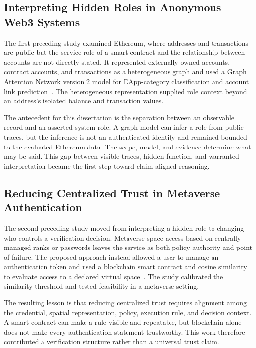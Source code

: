 \subsection{Interpreting Hidden Roles in Anonymous Web3 Systems}
\label{subsec:ch1-trajectory-web3}

The first preceding study examined Ethereum, where addresses and transactions are
public but the service role of a smart contract and the relationship between
accounts are not directly stated.  It represented externally owned accounts,
contract accounts, and transactions as a heterogeneous graph and used a Graph
Attention Network version 2 model for DApp-category classification and account
link prediction~\cite{ko2024ethereum}.  The heterogeneous representation supplied
role context beyond an address's isolated balance and transaction values.

The antecedent for this dissertation is the separation between an observable
record and an asserted system role.  A graph model can infer a role from public
traces, but the inference is not an authenticated identity and remained bounded to
the evaluated Ethereum data.  The scope, model, and evidence determine what may
be said.  This gap between visible traces, hidden function, and warranted
interpretation became the first step toward claim-aligned reasoning.

\subsection{Reducing Centralized Trust in Metaverse Authentication}
\label{subsec:ch1-trajectory-metaverse}

The second preceding study moved from interpreting a hidden role to changing who
controls a verification decision.  Metaverse space access based on centrally
managed ranks or passwords leaves the service as both policy authority and point
of failure.  The proposed approach instead allowed a user to manage an
authentication token and used a blockchain smart contract and cosine similarity
to evaluate access to a declared virtual space~\cite{seo2024space}.  The study
calibrated the similarity threshold and tested feasibility in a metaverse setting.

The resulting lesson is that reducing centralized trust requires alignment among
the credential, spatial representation, policy, execution rule, and decision
context.  A smart contract can make a rule visible and repeatable, but blockchain
alone does not make every authentication statement trustworthy.  This work
therefore contributed a verification structure rather than a universal trust
claim.

